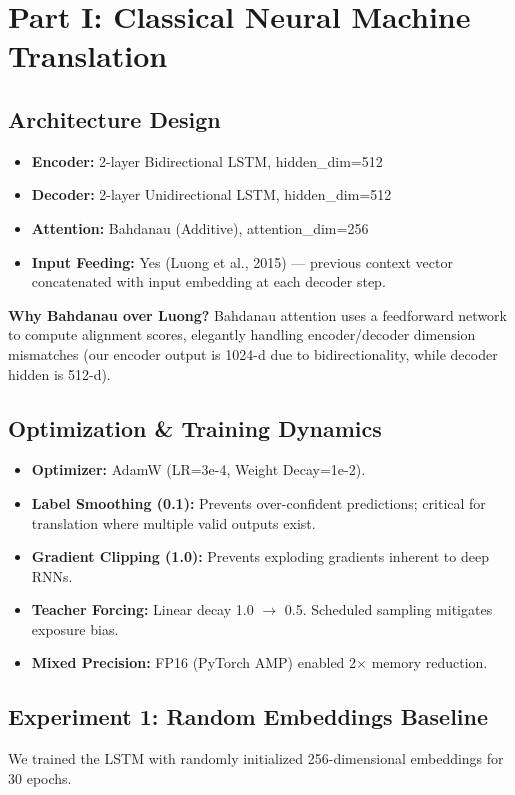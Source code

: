 \documentclass[11pt, a4paper]{article}
\begin{document}
\section{Part I: Classical Neural Machine Translation}

\subsection{Architecture Design}
\begin{itemize}
    \item \textbf{Encoder:} 2-layer Bidirectional LSTM, hidden\_dim=512
    \item \textbf{Decoder:} 2-layer Unidirectional LSTM, hidden\_dim=512
    \item \textbf{Attention:} Bahdanau (Additive), attention\_dim=256
    \item \textbf{Input Feeding:} Yes (Luong et al., 2015) --- previous context vector concatenated with input embedding at each decoder step.
\end{itemize}

\textbf{Why Bahdanau over Luong?} Bahdanau attention uses a feedforward network to compute alignment scores, elegantly handling encoder/decoder dimension mismatches (our encoder output is 1024-d due to bidirectionality, while decoder hidden is 512-d).

\subsection{Optimization \& Training Dynamics}
\begin{itemize}
    \item \textbf{Optimizer:} AdamW (LR=3e-4, Weight Decay=1e-2).
    \item \textbf{Label Smoothing (0.1):} Prevents over-confident predictions; critical for translation where multiple valid outputs exist.
    \item \textbf{Gradient Clipping (1.0):} Prevents exploding gradients inherent to deep RNNs.
    \item \textbf{Teacher Forcing:} Linear decay 1.0 $\rightarrow$ 0.5. Scheduled sampling mitigates exposure bias.
    \item \textbf{Mixed Precision:} FP16 (PyTorch AMP) enabled 2$\times$ memory reduction.
\end{itemize}

\subsection{Experiment 1: Random Embeddings Baseline}
We trained the LSTM with randomly initialized 256-dimensional embeddings for 30 epochs.
\end{document}

